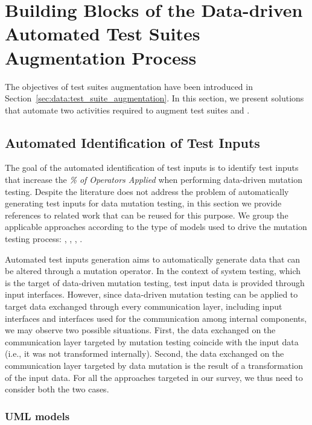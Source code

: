 
\section{Building Blocks of the Data-driven Automated Test Suites Augmentation Process}
\label{sec:testGenerationData}

The objectives of test suites augmentation have been introduced in Section~\ref{sec:data:test_suite_augmentation}.
In this section, we present solutions that automate two activities required to augment test suites
 and .

\subsection{Automated Identification of Test Inputs}

The goal of the automated identification of test inputs is to identify test inputs that increase the \emph{\% of Operators Applied} when performing data-driven mutation testing. Despite the literature does not address the problem of automatically generating test inputs for data mutation testing, in this section we provide references to related work that can be reused for this purpose. We group the applicable approaches according to the type of models used to drive the mutation testing process: , , , . 

Automated test inputs generation aims to automatically generate data that can be altered through a mutation operator. 
In the context of system testing, which is the target of data-driven mutation testing, test input data is provided through input interfaces. However, since data-driven mutation testing can be applied to target data exchanged through 
every communication layer, including input interfaces and interfaces used for the communication among internal components, we may observe two possible situations. First, the data exchanged on the communication layer targeted by mutation testing coincide with the input data (i.e., it was not transformed internally). Second, the data exchanged on the communication layer targeted by data mutation is the result of a transformation of the input data. For all the approaches targeted in our survey, we thus need to consider both the two cases.

\subsubsection{UML models}

